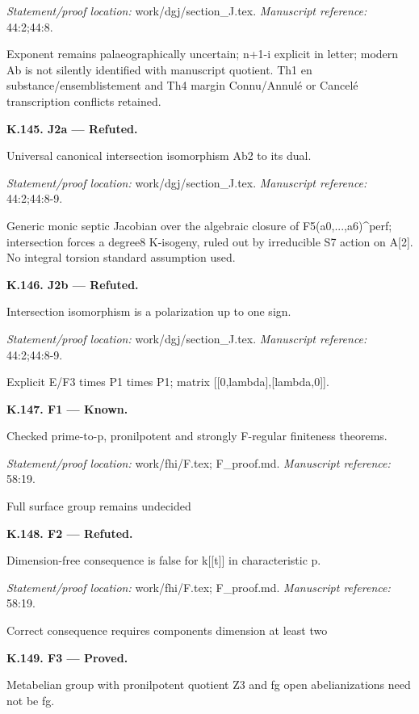 \par\emph{Statement/proof location:} work/dgj/section\_J.tex.
\emph{Manuscript reference:} 44:2;44:8.
\par Exponent remains palaeographically uncertain; n+1-i explicit in letter; modern Ab is not silently identified with manuscript quotient. Th1 en substance/ensemblistement and Th4 margin Connu/Annulé or Cancelé transcription conflicts retained.
\par\medskip\noindent\textbf{K.145. J2a --- Refuted.}\par
Universal canonical intersection isomorphism Ab2 to its dual.
\par\emph{Statement/proof location:} work/dgj/section\_J.tex.
\emph{Manuscript reference:} 44:2;44:8-9.
\par Generic monic septic Jacobian over the algebraic closure of F5(a0,...,a6)\textasciicircum{}perf; intersection forces a degree8 K-isogeny, ruled out by irreducible S7 action on A[2]. No integral torsion standard assumption used.
\par\medskip\noindent\textbf{K.146. J2b --- Refuted.}\par
Intersection isomorphism is a polarization up to one sign.
\par\emph{Statement/proof location:} work/dgj/section\_J.tex.
\emph{Manuscript reference:} 44:2;44:8-9.
\par Explicit E/F3 times P1 times P1; matrix [[0,lambda],[lambda,0]].
\par\medskip\noindent\textbf{K.147. F1 --- Known.}\par
Checked prime-to-p, pronilpotent and strongly F-regular finiteness theorems.
\par\emph{Statement/proof location:} work/fhi/F.tex; F\_proof.md.
\emph{Manuscript reference:} 58:19.
\par Full surface group remains undecided
\par\medskip\noindent\textbf{K.148. F2 --- Refuted.}\par
Dimension-free consequence is false for k[[t]] in characteristic p.
\par\emph{Statement/proof location:} work/fhi/F.tex; F\_proof.md.
\emph{Manuscript reference:} 58:19.
\par Correct consequence requires components dimension at least two
\par\medskip\noindent\textbf{K.149. F3 --- Proved.}\par
Metabelian group with pronilpotent quotient Z3 and fg open abelianizations need not be fg.
